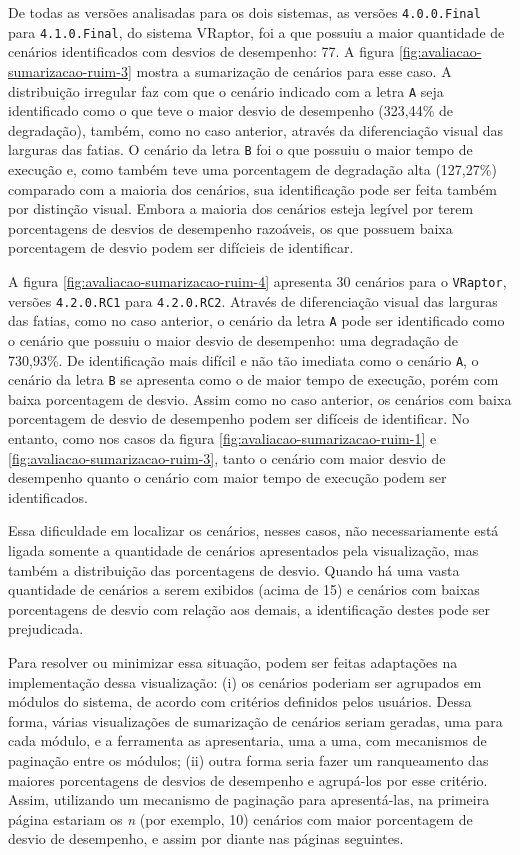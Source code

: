 De todas as versões analisadas para os dois sistemas, as versões \texttt{4.0.0.Final} para \texttt{4.1.0.Final}, do sistema VRaptor, foi a que possuiu a maior quantidade de cenários identificados com desvios de desempenho: 77. A figura \ref{fig:avaliacao-sumarizacao-ruim-3} mostra a sumarização de cenários para esse caso. A distribuição irregular faz com que o cenário indicado com a letra \texttt{A} seja identificado como o que teve o maior desvio de desempenho (323,44\% de degradação), também, como no caso anterior, através da diferenciação visual das larguras das fatias. O cenário da letra \texttt{B} foi o que possuiu o maior tempo de execução e, como também teve uma porcentagem de degradação alta (127,27\%) comparado com a maioria dos cenários, sua identificação pode ser feita também por distinção visual. Embora a maioria dos cenários esteja legível por terem porcentagens de desvios de desempenho razoáveis, os que possuem baixa porcentagem de desvio podem ser difícieis de identificar.

A figura \ref{fig:avaliacao-sumarizacao-ruim-4} apresenta 30 cenários para o \texttt{VRaptor}, versões \texttt{4.2.0.RC1} para \texttt{4.2.0.RC2}. Através de diferenciação visual das larguras das fatias, como no caso anterior, o cenário da letra \texttt{A} pode ser identificado como o cenário que possuiu o maior desvio de desempenho: uma degradação de 730,93\%. De identificação mais difícil e não tão imediata como o cenário \texttt{A}, o cenário da letra \texttt{B} se apresenta como o de maior tempo de execução, porém com baixa porcentagem de desvio. Assim como no caso anterior, os cenários com baixa porcentagem de desvio de desempenho podem ser difíceis de identificar. No entanto, como nos casos da figura \ref{fig:avaliacao-sumarizacao-ruim-1} e \ref{fig:avaliacao-sumarizacao-ruim-3}, tanto o cenário com maior desvio de desempenho quanto o cenário com maior tempo de execução podem ser identificados.

Essa dificuldade em localizar os cenários, nesses casos, não necessariamente está ligada somente a quantidade de cenários apresentados pela visualização, mas também a distribuição das porcentagens de desvio. Quando há uma vasta quantidade de cenários a serem exibidos (acima de 15) e cenários com baixas porcentagens de desvio com relação aos demais, a identificação destes pode ser prejudicada.

Para resolver ou minimizar essa situação, podem ser feitas adaptações na implementação dessa visualização: (i) os cenários poderiam ser agrupados em módulos do sistema, de acordo com critérios definidos pelos usuários. Dessa forma, várias visualizações de sumarização de cenários seriam geradas, uma para cada módulo, e a ferramenta as apresentaria, uma a uma, com mecanismos de paginação entre os módulos; (ii) outra forma seria fazer um ranqueamento das maiores porcentagens de desvios de desempenho e agrupá-los por esse critério. Assim, utilizando um mecanismo de paginação para apresentá-las, na primeira página estariam os \textit{n} (por exemplo, 10) cenários com maior porcentagem de desvio de desempenho, e assim por diante nas páginas seguintes.

